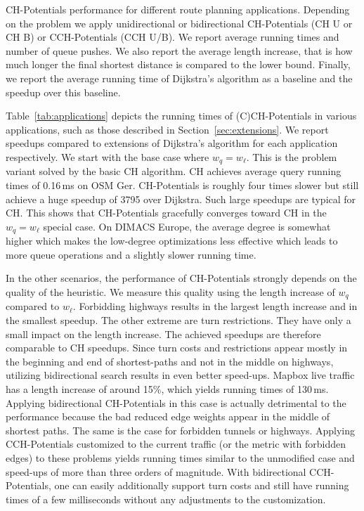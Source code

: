 \documentclass[manuscript,review]{acmart}
\begin{document}
\begin{table}
\centering
\caption{
CH-Potentials performance for different route planning applications.
Depending on the problem we apply unidirectional or bidirectional CH-Potentials (CH U or CH B) or CCH-Potentials (CCH U/B).
We report average running times and number of queue pushes.
We also report the average length increase, that is how much longer the final shortest distance is compared to the lower bound.
Finally, we report the average running time of Dijkstra's algorithm as a baseline and the speedup over this baseline.
}\label{tab:applications}

\end{table}

Table~\ref{tab:applications} depicts the running times of (C)CH-Potentials in various applications, such as those described in Section~\ref{sec:extensions}.
We report speedups compared to extensions of Dijkstra's algorithm for each application respectively.
We start with the base case where $w_q = w_\ell$.
This is the problem variant solved by the basic CH algorithm.
CH achieves average query running times of 0.16\,ms on OSM Ger.
CH-Potentials is roughly four times slower but still achieve a huge speedup of 3795 over Dijkstra.
Such large speedups are typical for CH.
This shows that CH-Potentials gracefully converges toward CH in the $w_q = w_\ell$ special case.
On DIMACS Europe, the average degree is somewhat higher which makes the low-degree optimizations less effective which leads to more queue operations and a slightly slower running time.

In the other scenarios, the performance of CH-Potentials strongly depends on the quality of the heuristic.
We measure this quality using the length increase of $w_q$ compared to $w_\ell$.
Forbidding highways results in the largest length increase and in the smallest speedup.
The other extreme are turn restrictions.
They have only a small impact on the length increase.
The achieved speedups are therefore comparable to CH speedups.
Since turn costs and restrictions appear mostly in the beginning and end of shortest-paths and not in the middle on highways, utilizing bidirectional search results in even better speed-ups.
Mapbox live traffic has a length increase of around 15\%, which yields running times of 130\,ms.
Applying bidirectional CH-Potentials in this case is actually detrimental to the performance because the bad reduced edge weights appear in the middle of shortest paths.
The same is the case for forbidden tunnels or highways.
Applying CCH-Potentials customized to the current traffic (or the metric with forbidden edges) to these problems yields running times similar to the unmodified case and speed-ups of more than three orders of magnitude.
With bidirectional CCH-Potentials, one can easily additionally support turn costs and still have running times of a few milliseconds without any adjustments to the customization.
\end{document}
